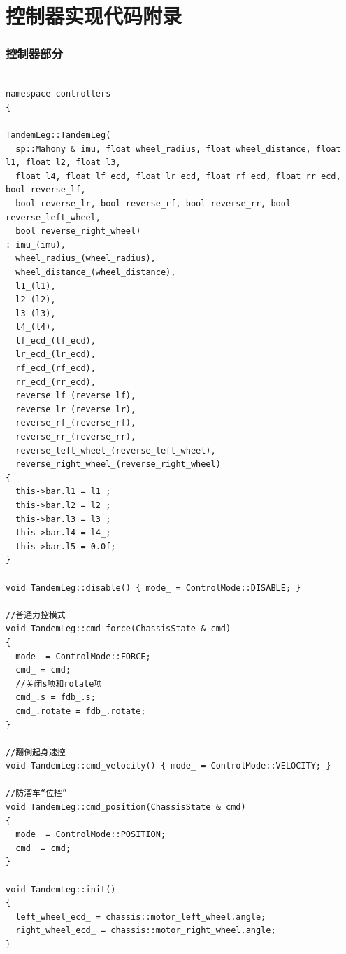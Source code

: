 \chapter{控制器实现代码附录}\label{chap:control-code}
\subsection{控制器部分}
\begin{verbatim}

namespace controllers
{

TandemLeg::TandemLeg(
  sp::Mahony & imu, float wheel_radius, float wheel_distance, float l1, float l2, float l3,
  float l4, float lf_ecd, float lr_ecd, float rf_ecd, float rr_ecd, bool reverse_lf,
  bool reverse_lr, bool reverse_rf, bool reverse_rr, bool reverse_left_wheel,
  bool reverse_right_wheel)
: imu_(imu),
  wheel_radius_(wheel_radius),
  wheel_distance_(wheel_distance),
  l1_(l1),
  l2_(l2),
  l3_(l3),
  l4_(l4),
  lf_ecd_(lf_ecd),
  lr_ecd_(lr_ecd),
  rf_ecd_(rf_ecd),
  rr_ecd_(rr_ecd),
  reverse_lf_(reverse_lf),
  reverse_lr_(reverse_lr),
  reverse_rf_(reverse_rf),
  reverse_rr_(reverse_rr),
  reverse_left_wheel_(reverse_left_wheel),
  reverse_right_wheel_(reverse_right_wheel)
{
  this->bar.l1 = l1_;
  this->bar.l2 = l2_;
  this->bar.l3 = l3_;
  this->bar.l4 = l4_;
  this->bar.l5 = 0.0f;
}

void TandemLeg::disable() { mode_ = ControlMode::DISABLE; }

//普通力控模式
void TandemLeg::cmd_force(ChassisState & cmd)
{
  mode_ = ControlMode::FORCE;
  cmd_ = cmd;
  //关闭s项和rotate项
  cmd_.s = fdb_.s;
  cmd_.rotate = fdb_.rotate;
}

//翻倒起身速控
void TandemLeg::cmd_velocity() { mode_ = ControlMode::VELOCITY; }

//防溜车“位控”
void TandemLeg::cmd_position(ChassisState & cmd)
{
  mode_ = ControlMode::POSITION;
  cmd_ = cmd;
}

void TandemLeg::init()
{
  left_wheel_ecd_ = chassis::motor_left_wheel.angle;
  right_wheel_ecd_ = chassis::motor_right_wheel.angle;
}


\end{verbatim}
